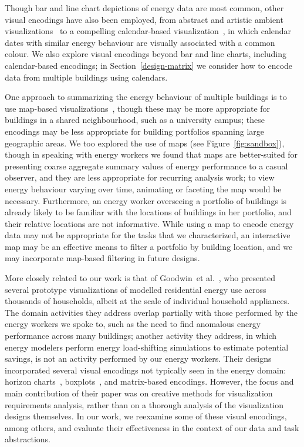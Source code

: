 \documentclass[journal]{vgtc}                %
\newcommand{\etal}{et al.}
\begin{document}
Though bar and line chart depictions of energy data are most common, other visual encodings have also been employed, from abstract and artistic ambient visualizations~\cite{Rodgers2011} to a compelling calendar-based visualization~\cite{vanWijk1999}, in which calendar dates with similar energy behaviour are visually associated with a common colour.
We also explore visual encodings beyond bar and line charts, including calendar-based encodings; in Section~\ref{design-matrix} we consider how to encode data from multiple buildings using calendars.

One approach to summarizing the energy behaviour of multiple buildings is to use map-based visualizations~\cite{Heat2014,MEP2014}, though these may be more appropriate for buildings in a shared neighbourhood, such as a university campus; these encodings may be less appropriate for building portfolios spanning large geographic areas.
We too explored the use of maps (see Figure~\ref{fig:sandbox}), though in speaking with energy workers we found that maps are better-suited for presenting coarse aggregate summary values of energy performance to a casual observer, and they are less appropriate for recurring analysis work; to view energy behaviour varying over time, animating or faceting the map would be necessary.
Furthermore, an energy worker overseeing a portfolio of buildings is already likely to be familiar with the locations of buildings in her portfolio, and their relative locations are not informative.
While using a map to encode energy data may not be appropriate for the tasks that we characterized, an interactive map may be an effective means to filter a portfolio by building location, and we may incorporate map-based filtering in future designs.

More closely related to our work is that of Goodwin~\etal~\cite{Goodwin2013}, who presented several prototype visualizations of modelled residential energy use across thousands of households, albeit at the scale of individual household appliances. 
The domain activities they address overlap partially with those performed by the energy workers we spoke to, such as the need to find anomalous energy performance across many buildings; another activity they address, in which energy modelers perform energy load-shifting simulations to estimate potential savings, is not an activity performed by our energy workers. 
Their designs incorporated several visual encodings not typically seen in the energy domain: horizon charts~\cite{Heer2009}, boxplots~\cite{Wickham2011}, and matrix-based encodings.
However, the focus and main contribution of their paper was on creative methods for visualization requirements analysis, rather than on a thorough analysis of the visualization designs themselves.
In our work, we reexamine some of these visual encodings, among others, and evaluate their effectiveness in the context of our data and task abstractions. 
\end{document}
